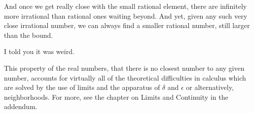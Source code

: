 \documentclass[11pt, oneside]{article}
\begin{document}
And once we get really close with the small rational element, there are infinitely more irrational than rational ones waiting beyond.  And yet, given any such very close irrational number, we can always find a smaller rational number, still larger than the bound.

I told you it was weird.

This property of the real numbers, that there is no closest number to any given number, accounts for virtually all of the theoretical difficulties in calculus which are solved by the use of limits and the apparatus of $\delta$ and $\epsilon$ or alternatively, neighborhoods.  For more, see the chapter on Limits and Continuity in the addendum.
\end{document}

